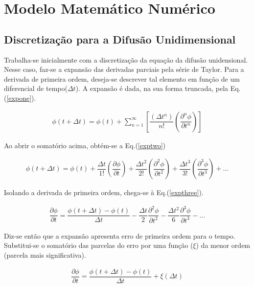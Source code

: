 \chapter{Modelo Matemático Numérico}

\noindent

\section{Discretização para a Difusão Unidimensional}

\noindent

	Trabalha-se inicialmente com a discretização da equação da difusão unidensional. Nesse caso, faz-se a expansão das derivadas parciais pela série de Taylor. 
	Para a derivada de primeira ordem, deseja-se descrever tal elemento em função de um diferencial de tempo($\Delta t$). A expansão é dada, na sua forma truncada, pela Eq.(\ref{expone}).
	
\begin{align}
\label{expone}
\phi(t + \Delta t) = \phi(t) + \sum_{n=1}^{\infty} \left[ \dfrac{(\Delta t^n)}{n!} \left(\dfrac{\partial^n \phi}{\partial t^n} \right)   \right] 
\end{align}

	Ao abrir o somatório acima, obtém-se a Eq.(\ref{exptwo})

\begin{align}
\label{exptwo}
\phi(t + \Delta t) = \phi(t) + \dfrac{\Delta t}{1!} \left(\dfrac{\partial \phi}{\partial t} \right) + \dfrac{\Delta t^2}{2!} \left(\dfrac{\partial^2 \phi}{\partial t^2} \right) + \dfrac{\Delta t^3}{3!} \left(\dfrac{\partial^3 \phi}{\partial t^3} \right) + ...
\end{align}

	Isolando a derivada de primeira ordem, chega-se à Eq.(\ref{expthree}).

\begin{align}
\label{expthree}
\dfrac{\partial \phi}{\partial t} = \dfrac{\phi(t+\Delta t) - \phi(t)}{\Delta t} - \dfrac{\Delta t}{2} \dfrac{\partial^2 \phi}{\partial t^2} - \dfrac{\Delta t^2}{6} \dfrac{\partial^3 \phi}{\partial t^3} - ...
\end{align}
	
	Diz-se então que a expansão apresenta erro de primeira ordem para o tempo. Substitui-se o somatório das parcelas do erro por uma função ($\xi$) da menor ordem (parcela mais significativa).

\begin{align}
\label{expfour}
\dfrac{\partial \phi}{\partial t} = \dfrac{\phi(t+\Delta t) - \phi(t)}{\Delta t} + \xi(\Delta t)
\end{align}

